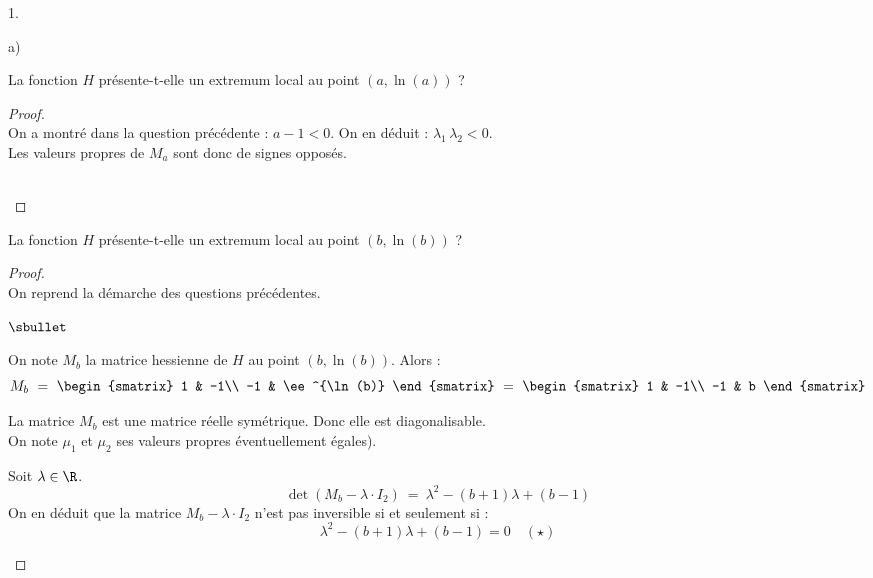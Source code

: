 \documentclass[11pt]{article}%
\begin{document}
\begin{noliste}{1.}
\begin{noliste}{a)}
    
    \item La fonction $H$ présente-t-elle un extremum local au point
    $(a,\ln(a))$ ?
    
    \begin{proof}~\\
      On a montré dans la question précédente : $a-1<0$. On en déduit : 
      $\lambda_1 \, \lambda_2 <0$.\\
      Les valeurs propres de $M_a$ sont donc de signes opposés.
      
      ~\\[-1.4cm]
    \end{proof}
  \end{noliste}
  
  
  \item La fonction $H$ présente-t-elle un extremum local au point 
  $(b,\ln(b))$ ?
  
  \begin{proof}~\\
    On reprend la démarche des questions précédentes.
    \begin{noliste}{$\sbullet$}
      \item On note $M_b$ la matrice hessienne de $H$ au point 
      $(b,\ln(b))$. Alors :
      \[
        M_b \ = \
        \begin{smatrix}
          1 & -1\\
          -1 & \ee^{\ln(b)}
        \end{smatrix}
        \ = \
        \begin{smatrix}
          1 & -1\\
          -1 & b
        \end{smatrix}
      \]
      
      \item La matrice $M_b$ est une matrice réelle symétrique. Donc 
      elle est diagonalisable.\\
      On note $\mu_1$ et $\mu_2$ ses valeurs propres éventuellement 
      égales).
      
      \item Soit $\lambda \in \R$.
      \[
        \det(M_b - \lambda \cdot I_2) \ = \ \lambda^2 - (b+1) \lambda 
        + (b-1)
      \]
      On en déduit que la matrice $M_b - \lambda \cdot I_2$ n'est pas 
      inversible si et seulement si :
      \[
        \lambda^2 - (b+1) \lambda + (b-1) = 0 \quad (\star)
      \]
      

\end{noliste}
\end{proof}
\end{noliste}
\end{document}
